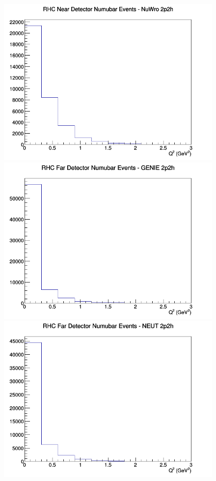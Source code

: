 \documentclass[12pt]{article}
\begin{document}
\begin{figure}[h]
\includegraphics[width=\linewidth]{eff_Q2/GAr/2p2h_RHC_ND_numubar_Q2_NuWro.png}
\endminipage
\newline
{}
\includegraphics[width=\linewidth]{eff_Q2/GAr/2p2h_RHC_FD_numubar_Q2_GENIE.png}
\endminipage
{}
\includegraphics[width=\linewidth]{eff_Q2/GAr/2p2h_RHC_FD_numubar_Q2_NEUT.png}

\end{figure}
\end{document}
